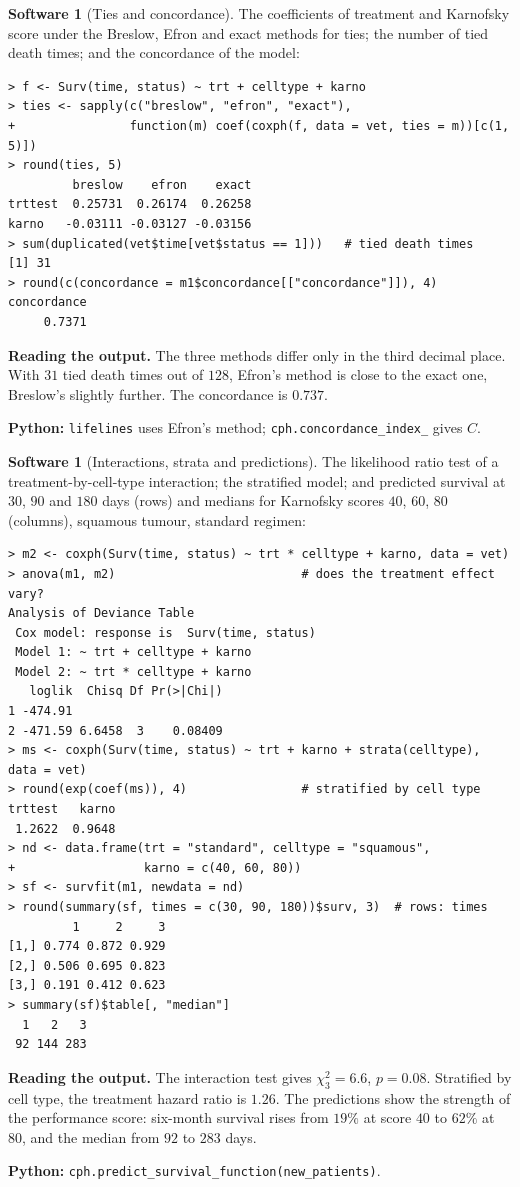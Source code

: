 \documentclass[11pt,a4paper]{article}
\numberwithin{equation}{section}
\theoremstyle{definition}
\newtheorem{software}[thm]{Software}
\begin{document}
\begin{software}[Ties and concordance]
\label{sw:ties}
The coefficients of treatment and Karnofsky score under the Breslow, Efron and exact methods for ties; the number of tied death times; and the concordance of the model:
{\small\begin{verbatim}
> f <- Surv(time, status) ~ trt + celltype + karno
> ties <- sapply(c("breslow", "efron", "exact"),
+                function(m) coef(coxph(f, data = vet, ties = m))[c(1, 5)])
> round(ties, 5)
         breslow    efron    exact
trttest  0.25731  0.26174  0.26258
karno   -0.03111 -0.03127 -0.03156
> sum(duplicated(vet$time[vet$status == 1]))   # tied death times
[1] 31
> round(c(concordance = m1$concordance[["concordance"]]), 4)
concordance 
     0.7371 
\end{verbatim}}
\textbf{Reading the output.} The three methods differ only in the third decimal place. With $31$ tied death times out of $128$, Efron's method is close to the exact one, Breslow's slightly further. The concordance is $0.737$.

\textbf{Python:} \texttt{lifelines} uses Efron's method; \texttt{cph.concordance\_index\_} gives $C$.
\end{software}

\begin{software}[Interactions, strata and predictions]
\label{sw:predict}
The likelihood ratio test of a treatment-by-cell-type interaction; the stratified model; and predicted survival at $30$, $90$ and $180$ days (rows) and medians for Karnofsky scores $40$, $60$, $80$ (columns), squamous tumour, standard regimen:
{\small\begin{verbatim}
> m2 <- coxph(Surv(time, status) ~ trt * celltype + karno, data = vet)
> anova(m1, m2)                          # does the treatment effect vary?
Analysis of Deviance Table
 Cox model: response is  Surv(time, status)
 Model 1: ~ trt + celltype + karno
 Model 2: ~ trt * celltype + karno
   loglik  Chisq Df Pr(>|Chi|)
1 -474.91                     
2 -471.59 6.6458  3    0.08409
> ms <- coxph(Surv(time, status) ~ trt + karno + strata(celltype), data = vet)
> round(exp(coef(ms)), 4)                # stratified by cell type
trttest   karno 
 1.2622  0.9648 
> nd <- data.frame(trt = "standard", celltype = "squamous",
+                  karno = c(40, 60, 80))
> sf <- survfit(m1, newdata = nd)
> round(summary(sf, times = c(30, 90, 180))$surv, 3)  # rows: times
         1     2     3
[1,] 0.774 0.872 0.929
[2,] 0.506 0.695 0.823
[3,] 0.191 0.412 0.623
> summary(sf)$table[, "median"]
  1   2   3 
 92 144 283 
\end{verbatim}}
\textbf{Reading the output.} The interaction test gives $\chi^2_3 = 6.6$, $p = 0.08$. Stratified by cell type, the treatment hazard ratio is $1.26$. The predictions show the strength of the performance score: six-month survival rises from $19\%$ at score $40$ to $62\%$ at $80$, and the median from $92$ to $283$ days.

\textbf{Python:} \texttt{cph.predict\_survival\_function(new\_patients)}.
\end{software}
\end{document}
